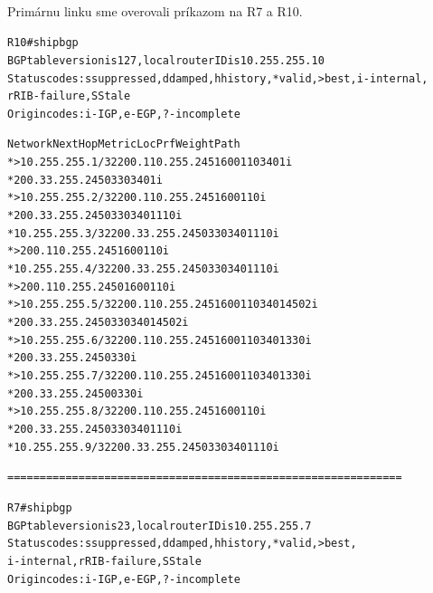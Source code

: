 \documentclass[12pt,twoside,a4paper]{report}
\begin{document}
\paragraph{}
Primárnu linku sme overovali príkazom  na R7 a R10.

\noindent
{\selectfont
\begin{small}
\begin{alltt}
R10#sh ip bgp
BGP table version is 127, local router ID is 10.255.255.10
Status codes: s suppressed, d damped, h history, * valid, > best, i - internal,
              r RIB-failure, S Stale
Origin codes: i - IGP, e - EGP, ? - incomplete

   Network          Next Hop            Metric LocPrf Weight Path
*> 10.255.255.1/32  200.110.255.245               160      0 110 3401 i
*                   200.33.255.245                         0 330 3401 i
*> 10.255.255.2/32  200.110.255.245               160      0 110 i
*                   200.33.255.245                         0 330 3401 110 i
*  10.255.255.3/32  200.33.255.245                         0 330 3401 110 i
*>                  200.110.255.245               160      0 110 i
*  10.255.255.4/32  200.33.255.245                         0 330 3401 110 i
*>                  200.110.255.245          0    160      0 110 i
*> 10.255.255.5/32  200.110.255.245               160      0 110 3401 4502 i
*                   200.33.255.245                         0 330 3401 4502 i
*> 10.255.255.6/32  200.110.255.245               160      0 110 3401 330 i
*                   200.33.255.245                         0 330 i
*> 10.255.255.7/32  200.110.255.245               160      0 110 3401 330 i
*                   200.33.255.245           0             0 330 i
*> 10.255.255.8/32  200.110.255.245               160      0 110 i
*                   200.33.255.245                         0 330 3401 110 i
*  10.255.255.9/32  200.33.255.245                         0 330 3401 110 i


=============================================================


R7#sh ip bgp
BGP table version is 23, local router ID is 10.255.255.7
Status codes: s suppressed, d damped, h history, * valid, > best, 
              i - internal, r RIB-failure, S Stale
Origin codes: i - IGP, e - EGP, ? - incomplete


\end{alltt}
\end{small}}
\end{document}
